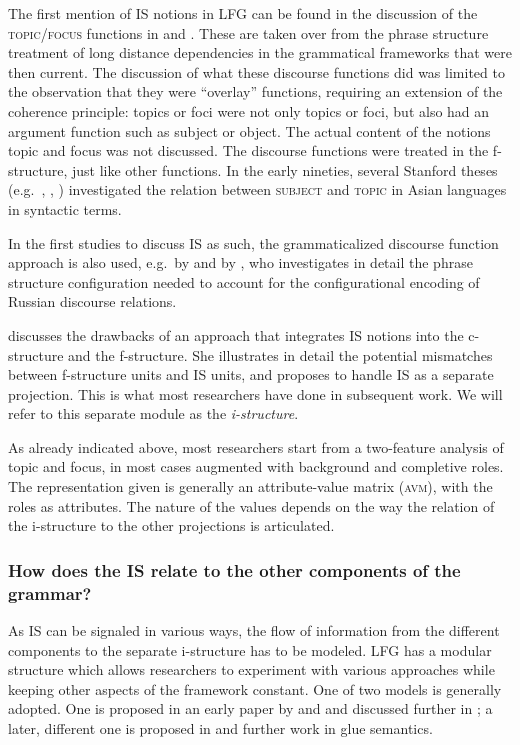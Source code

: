 \documentclass[output=paper,hidelinks]{langscibook}
\begin{document}
The first mention of IS notions in LFG can be found in the discussion of the \textsc{topic/focus} functions in \citet{kaplanbresnan82} and \citet{Zaenen85}. These are  taken over from the phrase structure treatment of long distance dependencies in the grammatical frameworks that were then current. The discussion of what these discourse functions did was limited to the observation that they were ``overlay'' functions, requiring an extension of the coherence principle: topics or foci were not only topics or foci, but also had an argument function such as subject or object. The actual content of the notions topic and focus was not discussed. The discourse functions were treated in the f-structure, just like other functions. In the early nineties, several Stanford theses (e.g.\ \citealt{Alsagoff92}, \citealt{Joshi93}, \citealt{Kroeger91}) investigated the relation between \textsc{subject} and \textsc{topic} in Asian languages in syntactic terms.

In the first studies to discuss IS as such, the grammaticalized discourse function approach is also used, e.g.\ by \citet{BM87} and by \citet{King95}, who investigates in detail the phrase structure configuration needed to account for the configurational encoding of Russian discourse relations. 

\citet{King1997} discusses the drawbacks of an approach that integrates IS notions into the c-structure and the f-structure. She illustrates in detail the potential mismatches between f-structure units and IS units, and proposes to handle IS as a separate projection. This is what most researchers have done in subsequent work. We will refer to this separate module as the \emph{i-structure}. 

As already indicated above, most researchers start from a two-feature analysis of topic and focus, in most cases augmented with background and completive roles. The representation given is generally an attribute-value matrix (\textsc{avm}), with the roles as attributes. The nature of the values depends on the way the relation of the i-structure to the other projections is articulated. 

\subsubsection{How does the IS relate to the other components of the grammar?}

As IS can be signaled in various ways, the flow of information from the different components to the separate i-structure has to be modeled.  LFG has a modular structure which allows researchers to experiment with various approaches while keeping other aspects of the framework constant. One of two models is generally adopted. One is proposed in an early paper by \citet{BK96} and \citet{King1997} and discussed further in \citet{BK00}; a later, different one is proposed in \citet{DN} and further work in glue semantics.
\end{document}
